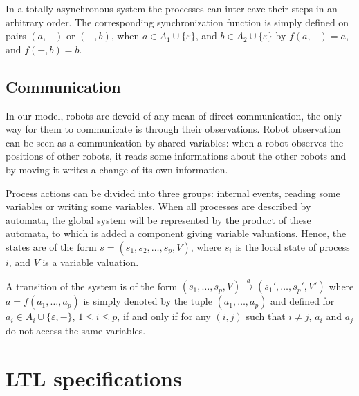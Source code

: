 In a totally asynchronous system the processes can interleave their
steps in an arbitrary order. The corresponding synchronization function is simply
defined on pairs $(a,-)$ or $(-,b)$, when $a \in A_1 \cup
\{\varepsilon\}$, and $b \in A_2 \cup \{\varepsilon\}$ by
$f(a,-)=a$, and $f(-,b)=b$.


\subsection{Communication}
 In our model, robots are devoid of any mean of direct communication, 
 the only way for them to communicate is through their observations.
 Robot observation can be seen as a communication by shared variables: 
 when a robot observes the positions of other robots, it reads some informations
 about the other robots and by moving it writes a change of its own information.

Process actions can be divided into three groups: internal events,
reading some variables or writing some variables. When all processes are described by 
automata, the global system will be represented by the product of
these  automata, to which is added a component giving variable valuations.
Hence, the
states are of the form $s=(s_1,s_2, \dots, s_p, V)$, where $s_i$ is
the local state of process $i$, and $V$ is a variable valuation. 

A transition of the system is of the form $(s_1, \dots, s_p,V)
\xrightarrow{a} (s_1',\dots,s_p',V')$ where $a=f(a_1, \dots,a_p)$ is
simply denoted by the tuple $(a_1, \dots,a_p)$ and defined for $a_i
\in A_i\cup\{\varepsilon,-\}$, $1\leq i \leq p$, if and only if for
any $(i,j)$ such that $i \neq j$, $a_i$ and $a_j$ do not access the
same variables.



\section{\textsf{LTL} specifications}
\label{def:LTL}
